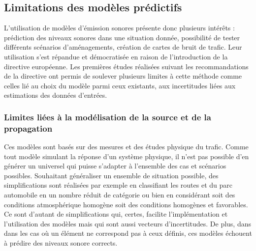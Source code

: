 

\subsection{Limitations des modèles prédictifs}

L'utilisation de modèles d'émission sonores présente donc plusieurs intérêts : prédiction des niveaux sonores dans une situation donnée, possibilité de tester différents scénarios d'aménagements, création de cartes de bruit de trafic. Leur utilisation s'est répandue et démocratisée en raison de l'introduction de la directive européenne. Les premières études réalisées suivant les recommandations de la directive ont permis de soulever plusieurs limites à cette méthode comme celles lié au choix du modèle parmi ceux existants, aux incertitudes liées aux estimations des données d'entrées.

\subsubsection{Limites liées à la modélisation de la source et de la propagation}

Ces modèles sont basés sur des mesures et des études physique du trafic. Comme tout modèle simulant la réponse d'un système physique, il n'est pas possible d'en générer un universel qui puisse s'adapter à l'ensemble des cas et scénarios possibles. Souhaitant généraliser un ensemble de situation possible, des simplifications sont réalisées par exemple en classifiant les routes et du parc automobile en un nombre réduit de catégorie ou bien en considérant soit des conditions atmosphérique homogène soit des conditions homogènes et favorables. Ce sont d'autant de simplifications qui, certes, facilite l'implémentation et l'utilisation des modèles mais qui sont aussi vecteurs d'incertitudes. De plus, dans dans les cas où un élément ne correspond pas à ceux définis, ces modèles échouent à prédire des niveaux sonore corrects.

